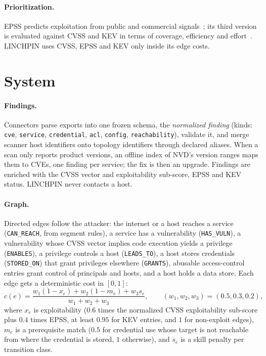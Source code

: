 \documentclass[11pt]{article}
\begin{document}
\paragraph{Prioritization.} EPSS predicts exploitation from public and commercial signals~\cite{jacobs2021epss}; its
third version is evaluated against CVSS and KEV in terms of coverage, efficiency and effort~\cite{jacobs2023enhancing}.
LINCHPIN uses CVSS, EPSS and KEV only inside its edge costs.

\section{System}
\label{sec:system}

\paragraph{Findings.} Connectors parse exports into one frozen schema, the \emph{normalized finding}
(kinds: \texttt{cve}, \texttt{service}, \texttt{credential}, \texttt{acl}, \texttt{config}, \texttt{reachability}),
validate it, and merge scanner host identifiers onto topology identifiers through declared aliases. When a scan only
reports product versions, an offline index of NVD's version ranges maps them to CVEs, one finding per service; the
fix is then an upgrade. Findings are enriched with the CVSS vector and exploitability sub-score, EPSS and KEV status.
LINCHPIN never contacts a host.

\paragraph{Graph.} Directed edges follow the attacker: the internet or a host reaches a service
(\texttt{CAN\_REACH}, from segment rules), a service has a vulnerability (\texttt{HAS\_VULN}), a vulnerability whose
CVSS vector implies code execution yields a privilege (\texttt{ENABLES}), a privilege controls a host
(\texttt{LEADS\_TO}), a host stores credentials (\texttt{STORED\_ON}) that grant privileges elsewhere
(\texttt{GRANTS}), abusable access-control entries grant control of principals and hosts, and a host holds a data
store. Each edge gets a deterministic cost in $[0,1]$:
\begin{equation}
c(e) = \frac{w_1 (1 - x_e) + w_2 (1 - m_e) + w_3 s_e}{w_1 + w_2 + w_3},\qquad (w_1, w_2, w_3) = (0.5, 0.3, 0.2),
\end{equation}
where $x_e$ is exploitability ($0.6$ times the normalized CVSS exploitability sub-score plus $0.4$ times EPSS, at least
$0.95$ for KEV entries, and $1$ for non-exploit edges), $m_e$ is a prerequisite match ($0.5$ for credential use whose
target is not reachable from where the credential is stored, $1$ otherwise), and $s_e$ is a skill penalty per
transition class.
\end{document}
